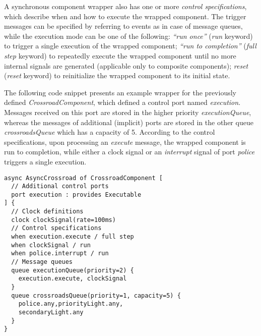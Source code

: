 A synchronous component wrapper also has one or more \emph{control specifications}, which describe when and how to execute the wrapped component. The trigger messages can be specified by referring to events as in case of message queues, while the execution mode can be one of the following: 
\emph{``run once''} (\emph{run} keyword) to trigger a single execution of the wrapped component;
\emph{``run to completion''} (\emph{full step} keyword) to repeatedly execute the wrapped component until no more internal signals are generated (applicable only to composite components);
\emph{reset} (\emph{reset} keyword) to reinitialize the wrapped component to its initial state.


The following code snippet presents an example wrapper for the previously defined \emph{CrossroadComponent}, which defined a control port named \emph{execution}. Messages received on this port are stored in the higher priority \emph{executionQueue}, whereas
the messages of additional (implicit) ports are stored in the other queue \emph{crossroadsQueue} which has a capacity of 5. According to the control specifications, upon processing an \emph{execute} message, the wrapped component is run to completion, while either
a clock signal or an \emph{interrupt} signal of port \emph{police} triggers a single execution.
\begin{lstlisting}
async AsyncCrossroad of CrossroadComponent [
  // Additional control ports
  port execution : provides Executable
] {
  // Clock definitions
  clock clockSignal(rate=100ms)
  // Control specifications
  when execution.execute / full step
  when clockSignal / run
  when police.interrupt / run
  // Message queues
  queue executionQueue(priority=2) {
    execution.execute, clockSignal
  }
  queue crossroadsQueue(priority=1, capacity=5) {
    police.any,priorityLight.any,
    secondaryLight.any
  }
}
\end{lstlisting}

